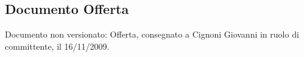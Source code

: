 \subsection{Documento Offerta}
Documento non versionato: Offerta, consegnato a Cignoni Giovanni in ruolo di committente, il 16/11/2009.
